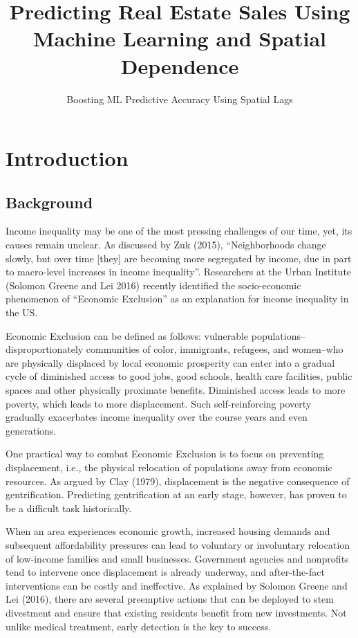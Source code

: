 \documentclass[]{article}
\title{Predicting Real Estate Sales Using Machine Learning and Spatial
Dependence}
\subtitle{Boosting ML Predictive Accuracy Using Spatial Lags}
\author{}
\date{}
\begin{document}
\maketitle

{
\setcounter{tocdepth}{2}
\tableofcontents
}
\section{Introduction}\label{introduction}

\subsection{Background}\label{background}

Income inequality may be one of the most pressing challenges of our
time, yet, its causes remain unclear. As discussed by Zuk (2015),
``Neighborhoods change slowly, but over time {[}they{]} are becoming
more segregated by income, due in part to macro-level increases in
income inequality''. Researchers at the Urban Institute (Solomon Greene
and Lei 2016) recently identified the socio-economic phenomenon of
``Economic Exclusion'' as an explanation for income inequality in the
US.

Economic Exclusion can be defined as follows: vulnerable
populations--disproportionately communities of color, immigrants,
refugees, and women--who are physically displaced by local economic
prosperity can enter into a gradual cycle of diminished access to good
jobs, good schools, health care facilities, public spaces and other
physically proximate benefits. Diminished access leads to more poverty,
which leads to more displacement. Such self-reinforcing poverty
gradually exacerbates income inequality over the course years and even
generations.

One practical way to combat Economic Exclusion is to focus on preventing
displacement, i.e., the physical relocation of populations away from
economic resources. As argued by Clay (1979), displacement is the
negative consequence of gentrification. Predicting gentrification at an
early stage, however, has proven to be a difficult task historically.

When an area experiences economic growth, increased housing demands and
subsequent affordability pressures can lead to voluntary or involuntary
relocation of low-income families and small businesses. Government
agencies and nonprofits tend to intervene once displacement is already
underway, and after-the-fact interventions can be costly and
ineffective. As explained by Solomon Greene and Lei (2016), there are
several preemptive actions that can be deployed to stem divestment and
ensure that existing residents benefit from new investments. Not unlike
medical treatment, early detection is the key to success.
\end{document}
